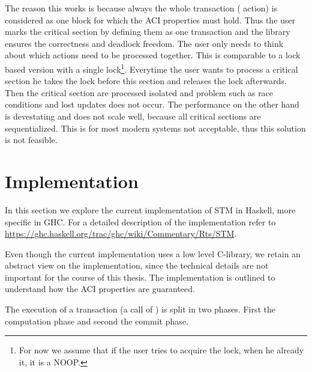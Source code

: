 The reason this works is because always the whole transaction ( action) is considered as one block for which
the ACI properties must hold. Thus the user marks the critical section by defining them as one transaction and the 
library ensures the correctness and deadlock freedom. The user only needs to think about which actions need to be 
processed together. This is comparable to a lock based version with a single lock\footnote{For now we assume that 
if the user tries to acquire the lock, when he already it, it is a NOOP.}. Everytime the user wants to process a 
critical section he takes the lock before this section and releases the lock afterwards. Then the critical section 
are processed isolated and problem such as race conditions and lost updates does not occur. The performance on the
other hand is devestating and does not scale well, because all critical sections are sequentialized. This is for
most modern systems not acceptable, thus this solution is not feasible.
  
\section{Implementation}
\label{sec:GHCImpl}
In this section we explore the current implementation of STM in Haskell, more specific in GHC. For a detailed description of the implementation 
refer to \url{https://ghc.haskell.org/trac/ghc/wiki/Commentary/Rts/STM}. 

Even though the current implementation uses a low level C-library, we retain an abstract view on the implementation, since the technical 
details are not important for the course of this thesis. The implementation is outlined to understand how the ACI 
properties are guaranteed.

The execution of a transaction (a call of ) is split in two phases. First the computation phase and second the commit phase. 
 
